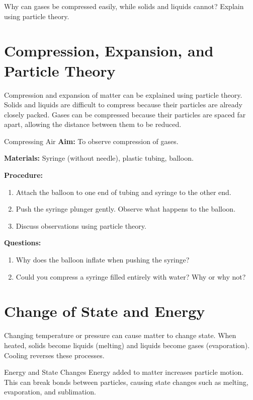 \begin{stopandthink}
Why can gases be compressed easily, while solids and liquids cannot? Explain using particle theory.
\end{stopandthink}

\section{Compression, Expansion, and Particle Theory}

Compression and expansion of matter can be explained using particle theory. Solids and liquids are difficult to compress because their particles are already closely packed. Gases can be compressed because their particles are spaced far apart, allowing the distance between them to be reduced.

\begin{investigation}{Compressing Air}
\textbf{Aim:} To observe compression of gases.

\textbf{Materials:} Syringe (without needle), plastic tubing, balloon.

\textbf{Procedure:}
\begin{enumerate}
    \item Attach the balloon to one end of tubing and syringe to the other end.
    \item Push the syringe plunger gently. Observe what happens to the balloon.
    \item Discuss observations using particle theory.
\end{enumerate}

\textbf{Questions:}
\begin{enumerate}
    \item Why does the balloon inflate when pushing the syringe?
    \item Could you compress a syringe filled entirely with water? Why or why not?
\end{enumerate}
\end{investigation}

\section{Change of State and Energy}

Changing temperature or pressure can cause matter to change state. When heated, solids become liquids (melting) and liquids become gases (evaporation). Cooling reverses these processes.

\begin{keyconcept}{Energy and State Changes}
Energy added to matter increases particle motion. This can break bonds between particles, causing state changes such as melting, evaporation, and sublimation.
\end{keyconcept}

